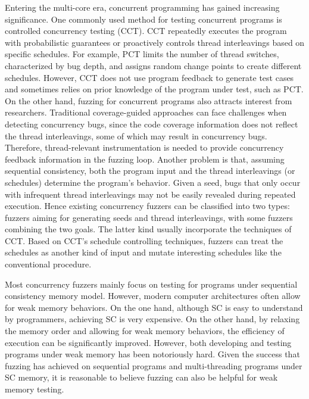 Entering the multi-core era, concurrent programming has gained increasing significance.
One commonly used method for testing concurrent programs is controlled concurrency testing (CCT). CCT repeatedly executes the program with probabilistic guarantees or proactively controls thread interleavings based on specific schedules. For example, PCT\cite{pct} limits the number of thread switches, characterized by bug depth, and assigns random change points to create different schedules. However, CCT does not use program feedback to generate test cases and sometimes relies on prior knowledge of the program under test, such as PCT.
On the other hand, fuzzing for concurrent programs also attracts interest from researchers. Traditional coverage-guided approaches can face challenges when detecting concurrency bugs, since the code coverage information does not reflect the thread interleavings, some of which may result in concurrency bugs. Therefore, thread-relevant instrumentation is needed to provide concurrency feedback information in the fuzzing loop. Another problem is that, assuming sequential consistency, both the program input and the thread interleavings (or schedules) determine the program's behavior. Given a seed, bugs that only occur with infrequent thread interleavings may not be easily revealed during repeated execution. Hence existing concurrency fuzzers can be classified into two types: fuzzers aiming for generating seeds\cite{muzz} and thread interleavings\cite{rff, conzzer}, with some fuzzers combining the two goals. The latter kind usually incorporate the techniques of CCT.  Based on CCT's schedule controlling techniques, fuzzers can treat the schedules as another kind of input and mutate interesting schedules like the conventional procedure. 


Most concurrency fuzzers mainly focus on testing for programs under sequential consistency memory model. However, modern computer architectures often allow for weak memory behaviors. On the one hand, although SC is easy to understand by programmers, achieving SC is very expensive. On the other hand, by relaxing the memory order and allowing for weak memory behaviors, the efficiency of execution can be significantly improved. However, both developing and testing programs under weak memory has been notoriously hard. Given the success that fuzzing has achieved on sequential programs and multi-threading programs under SC memory, it is reasonable to believe fuzzing can also be helpful for weak memory testing. 

